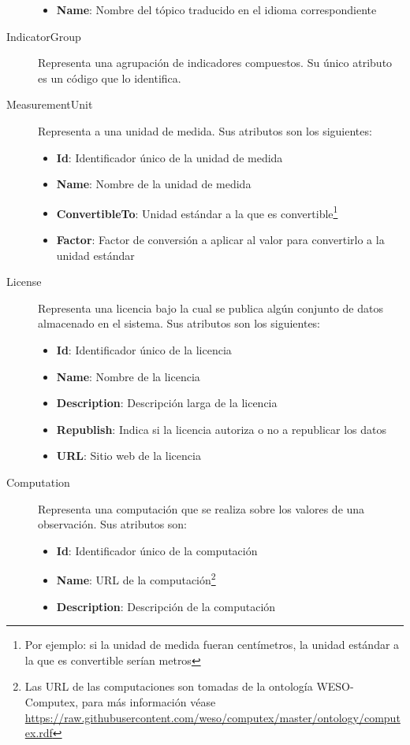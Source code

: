 \begin{description}
\begin{itemize}
			\item \textbf{Name}:  Nombre del tópico traducido en el idioma correspondiente
		\end{itemize}
	\item[IndicatorGroup]  Representa una agrupación de indicadores compuestos.  Su único atributo es un código que lo identifica.
	\item[MeasurementUnit]  Representa a una unidad de medida.  Sus atributos son los siguientes:
		\begin{itemize}
			\item \textbf{Id}:  Identificador único de la unidad de medida
			\item \textbf{Name}:  Nombre de la unidad de medida
			\item \textbf{ConvertibleTo}:  Unidad estándar a la que es convertible\footnote{Por ejemplo: si la unidad de medida fueran centímetros, la unidad estándar a la que es convertible serían metros}
			\item \textbf{Factor}:  Factor de conversión a aplicar al valor para convertirlo a la unidad estándar
		\end{itemize}
	\item[License]  Representa una licencia bajo la cual se publica algún conjunto de datos almacenado en el sistema.  Sus atributos son los siguientes:
		\begin{itemize}
			\item \textbf{Id}:  Identificador único de la licencia
			\item \textbf{Name}:  Nombre de la licencia
			\item \textbf{Description}:  Descripción larga de la licencia
			\item \textbf{Republish}:  Indica si la licencia autoriza o no a republicar los datos
			\item \textbf{URL}:  Sitio web de la licencia
		\end{itemize}
	\item[Computation]  Representa una computación que se realiza sobre los valores de una observación.  Sus atributos son:
		\begin{itemize}
			\item \textbf{Id}:  Identificador único de la computación
			\item \textbf{Name}:  URL de la computación\footnote{Las URL de las computaciones son tomadas de la ontología WESO-Computex, para más información véase \url{https://raw.githubusercontent.com/weso/computex/master/ontology/computex.rdf}}
			\item \textbf{Description}:  Descripción de la computación

\end{itemize}
\end{description}
